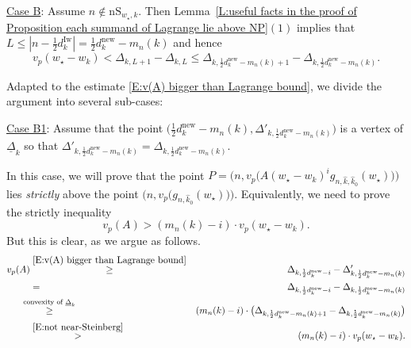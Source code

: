 \documentclass[12pt]{amsart}
\theoremstyle{definition}
\numberwithin{equation}{subsection}
\newcommand{\new}{\mathrm{new}}
\newcommand{\Iw}{\mathrm{Iw}}
\newcommand{\nS}{\mathrm{nS}}
\begin{document}
\medskip
\underline{Case B}: 
Assume $n \notin \nS_{w_\star ,k}$.  Then Lemma~\ref{L:useful facts in the proof of Proposition each summand of Lagrange lie above NP}$(1)$ implies that $L\leq |n-\tfrac 12 d_k^\Iw|=\tfrac 12 d_k^\new-m_n(k)$ and hence 
\begin{equation}
\label{E:not near-Steinberg}
v_p(w_\star - w_k) <\Delta_{k,L+1}-\Delta_{k,L}\leq  \Delta_{k, \frac 12 d^\new_{k} - m_n(k)+1} - \Delta_{k, \frac 12 d_{k}^\new - m_n(k)}.
\end{equation}


Adapted to the estimate \eqref{E:v(A) bigger than Lagrange bound}, we divide the argument into several sub-cases:

\smallskip
\underline{Case B1}:  Assume that the point $\big(\tfrac 12 d_k^\new-m_n(k), \Delta'_{k,\frac 12 d_k^\new-m_n(k)} \big)$ is a vertex of $\underline\Delta_k$ so that $\Delta'_{k,\frac 12 d_k^\new-m_n(k)}=\Delta_{k,\frac 12 d_k^\new-m_n(k)}$.

In this case, we will prove that the point $P = \big(n,v_p\big(A(w_\star-w_k)^ig_{n,\hat{ k},\hat{ k}_0}(w_\star)\big)\big)$ lies \emph{strictly} above the point $\big(n, v_p\big( g_{n,\hat{k}_0}(w_\star)\big) \big)$. Equivalently, we need to prove the strictly inequality
$$
v_p(A) > (m_n(k) - i) \cdot  v_p(w_\star - w_k).
$$
But this is clear, as we argue as follows.
\begin{eqnarray*}
		v_p(A)& \stackrel{\eqref{E:v(A) bigger than Lagrange bound}}{\geq}& \Delta_{k, \frac 12 d_{k}^\new - i} -  \Delta'_{k, \frac 12 d_{k}^\new - m_n(k)}
		\\&=& \Delta_{k, \frac 12 d_{k}^\new - i} -  \Delta_{k, \frac 12 d_{k}^\new - m_n(k)}
		\\&\hspace{-10pt} \stackrel{\textrm{convexity of $\underline \Delta_k$}}{\geq }\hspace{-10pt}& (m_n(k) -i)\cdot \big(  \Delta_{k, \frac 12 d_{k}^\new - m_n(k)+1} - \Delta_{k, \frac 12 d_{k}^\new - m_n(k)} \big)
		\\&
		\stackrel{\eqref{E:not near-Steinberg}}{>} & (m_n(k) - i) \cdot  v_p(w_\star - w_k).
	\end{eqnarray*}
\end{document}
